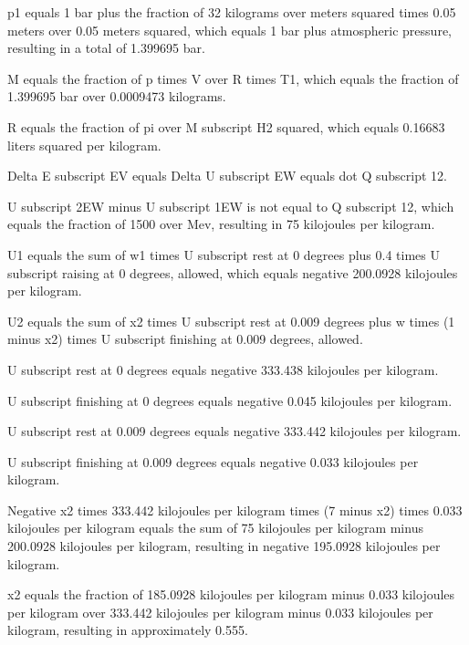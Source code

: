 p1 equals 1 bar plus the fraction of 32 kilograms over meters squared times 0.05 meters over 0.05 meters squared, which equals 1 bar plus atmospheric pressure, resulting in a total of 1.399695 bar.

M equals the fraction of p times V over R times T1, which equals the fraction of 1.399695 bar over 0.0009473 kilograms.

R equals the fraction of pi over M subscript H2 squared, which equals 0.16683 liters squared per kilogram.

Delta E subscript EV equals Delta U subscript EW equals dot Q subscript 12.

U subscript 2EW minus U subscript 1EW is not equal to Q subscript 12, which equals the fraction of 1500 over Mev, resulting in 75 kilojoules per kilogram.

U1 equals the sum of w1 times U subscript rest at 0 degrees plus 0.4 times U subscript raising at 0 degrees, allowed, which equals negative 200.0928 kilojoules per kilogram.

U2 equals the sum of x2 times U subscript rest at 0.009 degrees plus w times (1 minus x2) times U subscript finishing at 0.009 degrees, allowed.

U subscript rest at 0 degrees equals negative 333.438 kilojoules per kilogram.

U subscript finishing at 0 degrees equals negative 0.045 kilojoules per kilogram.

U subscript rest at 0.009 degrees equals negative 333.442 kilojoules per kilogram.

U subscript finishing at 0.009 degrees equals negative 0.033 kilojoules per kilogram.

Negative x2 times 333.442 kilojoules per kilogram times (7 minus x2) times 0.033 kilojoules per kilogram equals the sum of 75 kilojoules per kilogram minus 200.0928 kilojoules per kilogram, resulting in negative 195.0928 kilojoules per kilogram.

x2 equals the fraction of 185.0928 kilojoules per kilogram minus 0.033 kilojoules per kilogram over 333.442 kilojoules per kilogram minus 0.033 kilojoules per kilogram, resulting in approximately 0.555.